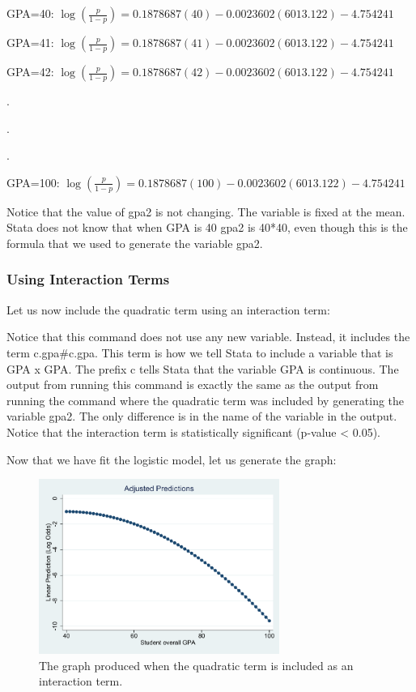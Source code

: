 \documentclass[a4paper,12pt,oneside]{book}
\begin{document}
GPA=40: $ \log(\frac{p}{1-p})=0.1878687(40)-0.0023602(6013.122)-4.754241 $

GPA=41: $ \log(\frac{p}{1-p})=0.1878687(41)-0.0023602(6013.122)-4.754241 $

GPA=42: $ \log(\frac{p}{1-p})=0.1878687(42)-0.0023602(6013.122)-4.754241 $

.

.

.

GPA=100: $ \log(\frac{p}{1-p})=0.1878687(100)-0.0023602(6013.122)-4.754241 $

Notice that the value of gpa2 is not changing. The variable is fixed at the mean. Stata does not know that when GPA is 40 gpa2 is 40*40, even though this is the formula that we used to generate the variable gpa2.
\subsubsection{Using Interaction Terms}
Let us now include the quadratic term using an interaction term:

\begin{stlog}\end{stlog}

Notice that this command does not use any new variable. Instead, it includes the term c.gpa\#c.gpa. This term is how we tell Stata to include a variable that is GPA x GPA. The prefix c tells Stata that the variable GPA is 
continuous. The output from running this command is exactly the same as the output from running the command where the quadratic term was included by generating the variable gpa2. The only difference is in the name of 
the variable in the output. Notice that the interaction term is statistically significant (p-value < 0.05).

Now that we have fit the logistic model, let us generate the graph:

\begin{figure}[h]
    \centering
    \includegraphics[width=0.7\textwidth]{book_18.pdf}
    \caption{The graph produced when the quadratic term is included as an interaction term.}
    \label{fig:quadratic2}
\end{figure}
\begin{stlog}\end{stlog}
\end{document}
